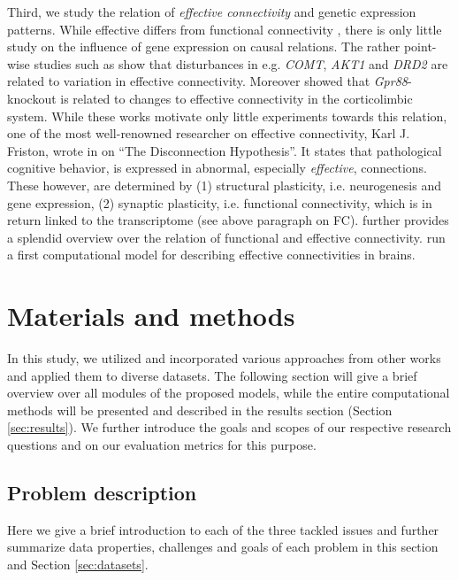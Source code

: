 \documentclass[]{article}
\renewcommand{\cite}{\citep}
\begin{document}
Third, we study the relation of \textit{effective connectivity} and genetic expression patterns. While effective differs from functional connectivity \cite{bauer2018effective}, there is only little study on the influence of gene expression on causal relations. The rather point-wise studies such as \citet{tan2012effective} show that disturbances in e.g. \textit{COMT}, \textit{AKT1} and \textit{DRD2} are related to variation in effective connectivity. Moreover \citet{hamida2018increased} showed that \textit{Gpr88}-knockout is related to changes to effective connectivity in the corticolimbic system. While these works motivate only little experiments towards this relation, one of the most well-renowned researcher on effective connectivity, Karl J. Friston, wrote in \citet{friston2002dysfunctional} on ``The Disconnection Hypothesis''. It states that pathological cognitive behavior, is expressed in abnormal, especially \textit{effective}, connections. These however, are determined by (1) structural plasticity, i.e. neurogenesis and gene expression, (2) synaptic plasticity, i.e. functional connectivity, which is in return linked to the transcriptome (see above paragraph on FC). \citet{friston2011functional} further provides a splendid overview over the relation of functional and effective connectivity. \citet{lepperod2018inferring} run a first computational model for describing effective connectivities in brains.


\newpage
\section{Materials and methods}
\label{sec:methods}
In this study, we utilized and incorporated various approaches from other works and applied them to diverse datasets. The following section will give a brief overview over all modules of the proposed models, while the entire computational methods will be presented and described in the results section (Section \ref{sec:results}). We further introduce the goals and scopes of our respective research questions and on our evaluation metrics for this purpose.  

\subsection{Problem description}
\label{sec:probdesc}
Here we give a brief introduction to each of the three tackled issues and further summarize data properties, challenges and goals of each problem in this section and Section \ref{sec:datasets}. 
\end{document}
